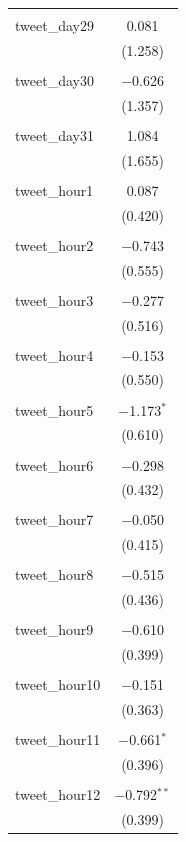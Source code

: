 \documentclass{article}
\begin{document}
\begin{longtable}{@{\extracolsep{10pt}}lc}
  & \\ 
 tweet\_day29 & 0.081 \\ 
  & (1.258) \\ 
  & \\ 
 tweet\_day30 & $-$0.626 \\ 
  & (1.357) \\ 
  & \\ 
 tweet\_day31 & 1.084 \\ 
  & (1.655) \\ 
  & \\ 
 tweet\_hour1 & 0.087 \\ 
  & (0.420) \\ 
  & \\ 
 tweet\_hour2 & $-$0.743 \\ 
  & (0.555) \\ 
  & \\ 
 tweet\_hour3 & $-$0.277 \\ 
  & (0.516) \\ 
  & \\ 
 tweet\_hour4 & $-$0.153 \\ 
  & (0.550) \\ 
  & \\ 
 tweet\_hour5 & $-$1.173$^{*}$ \\ 
  & (0.610) \\ 
  & \\ 
 tweet\_hour6 & $-$0.298 \\ 
  & (0.432) \\ 
  & \\ 
 tweet\_hour7 & $-$0.050 \\ 
  & (0.415) \\ 
  & \\ 
 tweet\_hour8 & $-$0.515 \\ 
  & (0.436) \\ 
  & \\ 
 tweet\_hour9 & $-$0.610 \\ 
  & (0.399) \\ 
  & \\ 
 tweet\_hour10 & $-$0.151 \\ 
  & (0.363) \\ 
  & \\ 
 tweet\_hour11 & $-$0.661$^{*}$ \\ 
  & (0.396) \\ 
  & \\ 
 tweet\_hour12 & $-$0.792$^{**}$ \\ 
  & (0.399) \\ 

\end{longtable}
\end{document}
